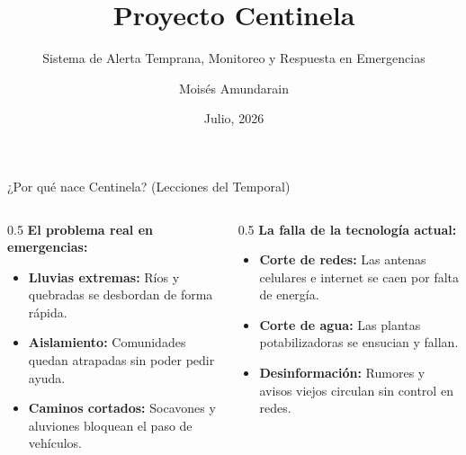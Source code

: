 \documentclass[aspectratio=169]{beamer}
\title[Proyecto Centinela]{Proyecto Centinela}
\subtitle{Sistema de Alerta Temprana, Monitoreo y Respuesta en Emergencias}
\author[Moisés Amundarain]{Moisés Amundarain}
\institute{Ingeniería Civil Informática}
\date{Julio, 2026}
\begin{document}
\begin{frame}
  \titlepage
\end{frame}

\begin{frame}{¿Por qué nace Centinela? (Lecciones del Temporal)}
  \begin{columns}
    \begin{column}{0.5\textwidth}
      \textbf{El problema real en emergencias:}
      \begin{itemize}
        \item \textbf{Lluvias extremas:} Ríos y quebradas se desbordan de forma rápida.
        \item \textbf{Aislamiento:} Comunidades quedan atrapadas sin poder pedir ayuda.
        \item \textbf{Caminos cortados:} Socavones y aluviones bloquean el paso de vehículos.
      \end{itemize}
    \end{column}
    \begin{column}{0.5\textwidth}
      \textbf{La falla de la tecnología actual:}
      \begin{itemize}
        \item \textbf{Corte de redes:} Las antenas celulares e internet se caen por falta de energía.
        \item \textbf{Corte de agua:} Las plantas potabilizadoras se ensucian y fallan.
        \item \textbf{Desinformación:} Rumores y avisos viejos circulan sin control en redes.
      \end{itemize}
    \end{column}
  \end{columns}
\end{frame}
\end{document}
